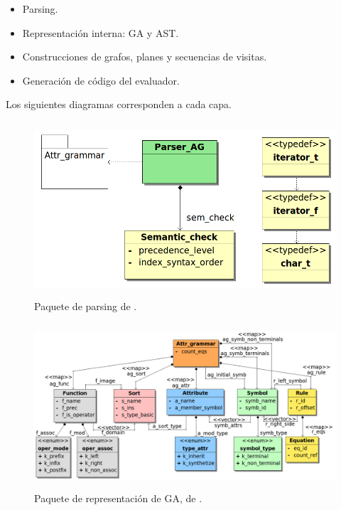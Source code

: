 \begin{itemize}
\item Parsing.
\item Representación interna: GA y AST.
\item Construcciones de grafos, planes y secuencias de visitas.
\item Generación de código del evaluador.
\end{itemize}

Los siguientes diagramas corresponden a cada capa.

\begin{figure}[!ht]\centering
\includegraphics[width=350pt, height=184pt]{diagramas/Parser.png}
\caption{\label{fig:dia-parser}Paquete de parsing de \maggen.}
\end{figure}

\begin{figure}[!ht]\centering
\includegraphics[width=350pt, height=174pt]{diagramas/Attr_grammar.png}
\caption{\label{fig:dia-grammar}Paquete de representación de GA, de \maggen.}
\end{figure}

